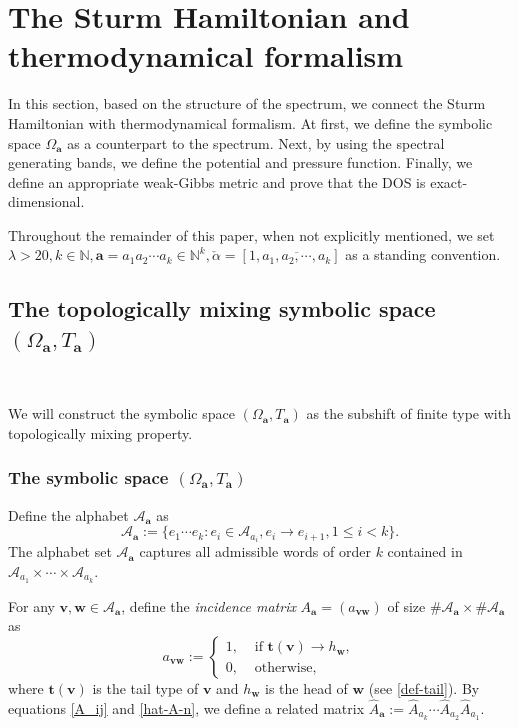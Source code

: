 \documentclass[reqno,11pt,graphicx,]{amsart}
\numberwithin{equation}{section}
\theoremstyle{plain}
\newcommand{\N}{{\mathbb N}}
\newcommand{\3}{\mathbf{3}}
\newcommand{\tT}{{\mathbf t}}
\newcommand{\ma}{\mathbf{a}}
\newcommand{\mv}{\mathbf{v}}
\begin{document}
	\section{The Sturm Hamiltonian and thermodynamical formalism}\label{sec-Sturm}
	In this section, based on the structure of the spectrum, we connect the Sturm Hamiltonian with thermodynamical formalism. At first, we define the symbolic space $\Omega_{\ma}$  as a counterpart to the spectrum. Next, by using the spectral generating bands, we define the potential and pressure function. Finally, we define an appropriate weak-Gibbs metric and prove that the DOS is exact-dimensional.
	
	Throughout the remainder of this paper, when not explicitly mentioned, we set 
	$\lambda>20,k\in\N,\mathbf{a}=a_1a_2\cdots a_k\in\N^k,\check{\alpha}=[1,\overline{a_1,a_2,\cdots,a_k}]$ as a standing convention.
	\subsection{The topologically mixing symbolic space $(\Omega_{\ma},T_{\mathbf{a}})$}\label{sec-Sturm-1}\ 
	
	We will construct the symbolic space $(\Omega_{\ma},T_{\ma})$ as the subshift of finite type with topologically mixing property. %
	\subsubsection{The symbolic space $(\Omega_{\ma},T_{\ma})$}
	Define the alphabet $\mathcal{A}_{\mathbf{a}}$ as 
	\begin{equation*}
		\mathcal{A}_{\mathbf{a}}:=\Big\{e_{1}\cdots e_{k}:e_i\in\mathscr{A}_{a_i}, e_{i}\rightarrow e_{i+1},1\leq i<k\Big\}.
	\end{equation*}
	The alphabet set $\mathcal{A}_{\ma}$ captures all admissible words of order $k$ contained in $ {\mathscr A}_{a_1}\times\cdots\times{\mathscr A}_{a_k}$.	
	
	For any $\mv,\mathbf{w}\in \mathcal{A}_{\ma}$, define
	the \textit{incidence matrix} $A_{\ma}=(a_{\mv\mathbf{w}})$ of size $\#\mathcal{A}_{\ma}\times \#\mathcal{A}_{\ma}$
	as
	\begin{equation*}\label{def-A}
		a_{\mv\mathbf{w}}:=%
		\begin{cases}
			1, & \text{ if }\mathbf{t}(\mv)\rightarrow h_{\mathbf{w}}, \\ 
			0, & \text{ otherwise},
		\end{cases}%
	\end{equation*}
	where $\tT(\mv)$ is the tail type of $\mv$ and $h_{\mathbf{w}}$ is the head of $\mathbf{w}$ (see \eqref{def-tail}).
	By equations \eqref{A_ij} and \eqref{hat-A-n}, we define a related
	matrix $\hat{A}_{\ma}:=\hat{A}_{a_k}\cdots\hat{A}_{a_2}\hat{A}_{a_1}$.
	
\end{document}
